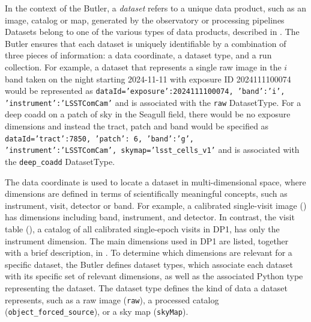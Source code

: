 In the context of the \gls{Butler}, a \emph{dataset} refers to a unique data product, such as an image, catalog or map, generated by the observatory or processing pipelines
Datasets belong to one of the various types of data products, described in .
The \gls{Butler} ensures that each dataset is uniquely identifiable by a combination of three pieces of information: a data coordinate, a dataset type, and a run collection.
For example, a dataset that represents a single raw image  in the $i$ band taken on the night starting 2024-11-11 with exposure ID 2024111100074 would be represented as  
\texttt{dataId={'exposure':2024111100074, 'band':'i', 'instrument':'LSSTComCam'}} and is associated with the \texttt{raw} DatasetType.
For a deep coadd on a \gls{patch} of sky in the Seagull field, there would be no exposure dimensions and instead the tract, \gls{patch} and band would be specified as  \texttt{dataId={'tract':7850, 'patch': 6, 'band':'g', 'instrument':'LSSTComCam', skymap='lsst\_cells\_v1'}} and is associated with the \texttt{deep\_coadd} DatasetType.



The data coordinate is used to locate a dataset in multi-dimensional space, where dimensions are defined in terms of scientifically meaningful concepts, such as instrument, visit, detector or band.
For example, a calibrated single-visit image () has dimensions including band, instrument, and detector.
In contrast, the visit table (), a catalog of all calibrated single-epoch visits in \gls{DP1}, has only the instrument dimension.
The main dimensions used in \gls{DP1} are listed, together with a brief description, in .
To determine which dimensions are relevant for a specific dataset, the \gls{Butler} defines dataset types, which associate each dataset with its specific set of relevant dimensions, as well as the associated Python type representing the dataset.
The dataset type defines the kind of data a dataset represents, such as  a raw image  (\texttt{raw}), a processed catalog (\texttt{object\_forced\_source}), or a \gls{sky map} (\texttt{skyMap}).

